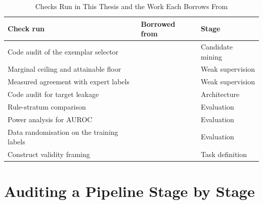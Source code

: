\begin{table}[!htbp]
\caption{Checks Run in This Thesis and the Work Each Borrows From}
\label{tab:lit-controls}
\centering
\small
\begin{tabular}{@{}>{\tblragged}p{2.5in}>{\tblragged}p{1.85in}>{\tblragged}p{1.25in}@{}}
\toprule
\textbf{Check run} & \textbf{Borrowed from} & \textbf{Stage} \\
\midrule
Code audit of the exemplar selector & \citep{sculley2015debt} & Candidate mining \\
\addlinespace[3pt]
Marginal ceiling and attainable floor & \citep{cohen1960kappa,tarone1990modified} & Weak supervision \\
\addlinespace[3pt]
Measured agreement with expert labels & \citep{pangakis2023validation} & Weak supervision \\
\addlinespace[3pt]
Code audit for target leakage & \citep{kaufman2012leakage} & Architecture \\
\addlinespace[3pt]
Rule-stratum comparison & \citep{barocas2021disaggregated} & Evaluation \\
\addlinespace[3pt]
Power analysis for AUROC & \citep{hanley1982meaning} & Evaluation \\
\addlinespace[3pt]
Data randomisation on the training labels & \citep{adebayo2018sanity} & Evaluation \\
\addlinespace[3pt]
Construct validity framing & \citep{jacobs2021measurement} & Task definition \\
\bottomrule
\end{tabular}
\end{table}

\section{Auditing a Pipeline Stage by Stage}
\label{sec:lit-selection}

